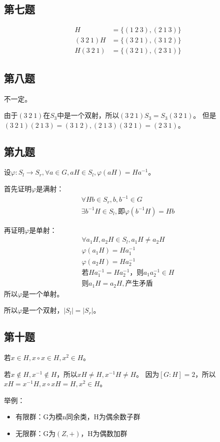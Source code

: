 \documentclass[12pt,onecolumn]{article}
\theoremstyle{plain}
\begin{document}
\subsection{第七题}
\begin{align*}
  H &= \{(1\ 2\ 3), (2\ 1\ 3)\} \\
  (3\ 2\ 1)H &= \{(3\ 2\ 1), (3\ 1\ 2)\} \\
  H(3\ 2\ 1) &= \{(3\ 2\ 1), (2\ 3\ 1)\}
\end{align*}

\subsection{第八题}
不一定。

由于$(3\ 2\ 1)$在$S_3$中是一个双射，所以$(3\ 2\ 1)S_3 = S_3(3\ 2\ 1)$。
但是$(3\ 2\ 1)(2\ 1\ 3) = (3\ 1\ 2), (2\ 1\ 3)(3\ 2\ 1) = (2\ 3\ 1)$。

\subsection{第九题}
\begin{proof*}
  设$\varphi: S_l \rightarrow S_r, \forall a\in G, aH \in S_l, \varphi(aH) = Ha^{-1}$。

  首先证明$\varphi$是满射：
  \begin{gather*}
    \forall Hb \in S_r, b, b^{-1} \in G \\
    \exists b^{-1}H \in S_l, \text{即} \varphi(b^{-1}H) = Hb
  \end{gather*}

  再证明$\varphi$是单射：
  \begin{gather*}
    \forall a_1H, a_2H \in S_l, a_1H \neq a_2H \\
    \varphi(a_1H) = Ha_1^{-1} \\
    \varphi(a_2H) = Ha_2^{-1} \\
    \text{若} Ha_1^{-1} = Ha_2^{-1}，\text{则} a_1a_2^{-1} \in H \\
    \text{则} a_1H = a_2H, \text{产生矛盾}
  \end{gather*}
  所以$\varphi$是一个单射。

  所以$\varphi$是一个双射，$|S_l| = |S_r|$。
\end{proof*}

\subsection{第十题}
\begin{proof*}
  若$x \in H, x \circ x \in H, x^2 \in H$。

  若$x \notin H, x^{-1} \notin H$，所以$xH \neq H, x^{-1}H \neq H$。
  因为$[G:H]=2$，所以$xH = x^{-1}H, x \circ xH = H, x^2 \in H$。
\end{proof*}
举例：
\begin{itemize}
\item 有限群：G为模n同余类，H为偶余数子群
\item 无限群：G为$(Z, +)$，H为偶数加群
\end{itemize}
\end{document}
